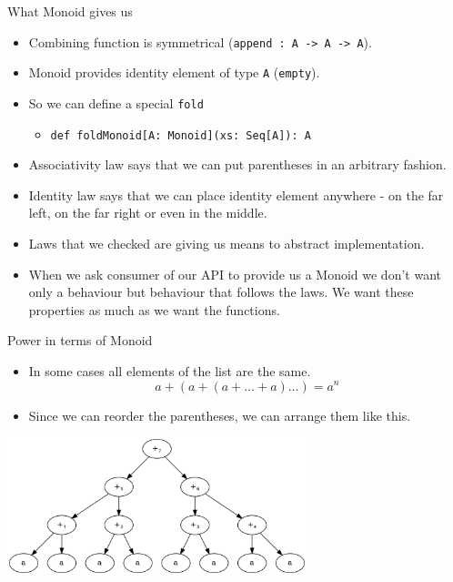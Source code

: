 \documentclass[presentation,aspectratio=169,smaller]{beamer}
\begin{document}
\begin{frame}[label={sec:orgbb75f19},fragile]{What Monoid gives us}
 \begin{itemize}
\item Combining function is symmetrical (\texttt{append : A -> A -> A}).
\item Monoid provides identity element of type \texttt{A} (\texttt{empty}).
\item So we can define a special \texttt{fold}
\begin{itemize}
\item \texttt{def foldMonoid[A: Monoid](xs: Seq[A]): A}
\end{itemize}
\item Associativity law says that we can put parentheses in an arbitrary fashion.
\item Identity law says that we can place identity element anywhere - on the far
left, on the far right or even in the middle.
\item Laws that we checked are giving us means to abstract implementation.
\item When we ask consumer of our API to provide us a Monoid we don't want only a
behaviour but behaviour that follows the \alert{laws}. We want these \alert{properties} as
much as we want the functions.
\end{itemize}
\end{frame}

\begin{frame}[label={sec:org88dd2a3}]{Power in terms of Monoid}
\begin{itemize}
\item In some cases all elements of the list are the same.
\pause
\begin{equation*}
  a + (a + (a + \ldots + a) \ldots ) = a ^ n
\end{equation*}
\end{itemize}

\pause

\begin{itemize}
\item Since we can reorder the parentheses, we can arrange them like this.
\end{itemize}

\pause
\begin{center}
\includegraphics[height=4cm]{.dot/fold-power-1.png}
\end{center}
\end{frame}
\end{document}
